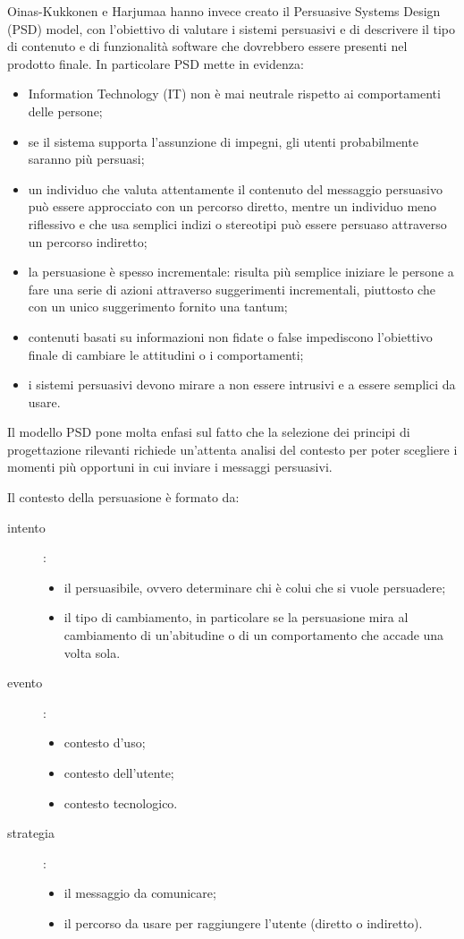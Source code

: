 Oinas-Kukkonen e Harjumaa hanno invece creato il Persuasive Systems Design (PSD) model, con l'obiettivo di valutare i sistemi persuasivi e di descrivere il tipo di contenuto e di funzionalità software che dovrebbero essere presenti nel prodotto finale.
In particolare PSD mette in evidenza:
\begin{itemize}
    \item Information Technology (IT) non è mai neutrale rispetto ai comportamenti delle persone;
    \item se il sistema supporta l'assunzione di impegni, gli utenti probabilmente saranno più persuasi;
    \item un individuo che valuta attentamente il contenuto del messaggio persuasivo può essere approcciato con un percorso diretto, mentre un individuo meno riflessivo e che usa semplici indizi o stereotipi può essere persuaso attraverso un percorso indiretto;
    \item la persuasione è spesso incrementale: risulta più semplice iniziare le persone a fare una serie di azioni attraverso suggerimenti incrementali, piuttosto che con un unico suggerimento fornito una tantum;
    \item contenuti basati su informazioni non fidate o false impediscono l'obiettivo finale di cambiare le attitudini o i comportamenti;
    \item i sistemi persuasivi devono mirare a non essere intrusivi e a essere semplici da usare.
\end{itemize}

Il modello PSD pone molta enfasi sul fatto che la selezione dei principi di progettazione rilevanti richiede un'attenta analisi del contesto per poter scegliere i momenti più opportuni in cui inviare i messaggi persuasivi.

Il contesto della persuasione è formato da:
\begin{description}
    \item[intento]:
    \begin{itemize}
        \item il persuasibile, ovvero determinare chi è colui che si vuole persuadere;
        \item il tipo di cambiamento, in particolare se la persuasione mira al cambiamento di un'abitudine o di un comportamento che accade una volta sola.
    \end{itemize}
    \item[evento]:
    \begin{itemize}
        \item contesto d'uso;
        \item contesto dell'utente;
        \item contesto tecnologico.
    \end{itemize}
    \item[strategia]:
    \begin{itemize}
        \item il messaggio da comunicare;
        \item il percorso da usare per raggiungere l'utente (diretto o indiretto).
    \end{itemize} 
\end{description}

